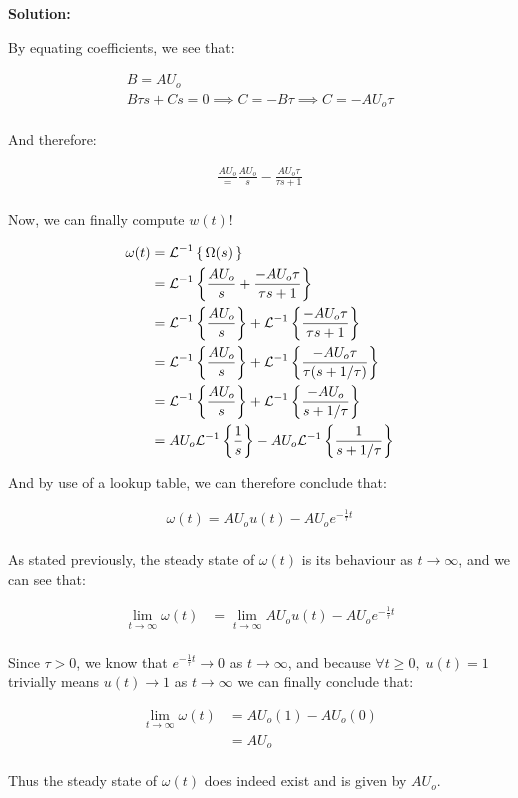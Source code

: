 \documentclass[10pt]{article}
\newenvironment{solution}{
	\vspace{1em}\par\large\textbf{{Solution:}}\par\vspace{1em}
}{
	\vspace{1em}
}
\begin{document}
\begin{solution}
	By equating coefficients, we see that:
	
	\begin{gather*}
		B = AU_{o} \\
		B\tau{s} + C{s} = 0 \implies C = -B\tau \implies C = -AU_{o}\tau \\
	\end{gather*}

	And therefore:

	\begin{gather*}
		\frac{AU_{o}} = \frac{AU_{o}}{s} - \frac{AU_{o}\tau}{\tau{s} + 1} \\
	\end{gather*}

	Now, we can finally compute $w(t)$!

	\begin{align*}
		\omega(t) &= \mathcal{L}^{-1}\set{\Omega(s)} \\
		&= \mathcal{L}^{-1} \left\{ \frac{AU_{o}}{s} + \frac{-AU_{o}\tau}{\tau{s} + 1} \right\} \\
		&= \mathcal{L}^{-1} \left\{ \frac{AU_{o}}{s} \right\} + \mathcal{L}^{-1} \left\{ \frac{-AU_{o}\tau}{\tau{s} + 1} \right\} \\
		&= \mathcal{L}^{-1} \left\{ \frac{AU_{o}}{s} \right\} + \mathcal{L}^{-1} \left\{ \frac{-AU_{o}\tau}{\tau(s + 1/\tau)} \right\} \\
		&= \mathcal{L}^{-1} \left\{ \frac{AU_{o}}{s} \right\} + \mathcal{L}^{-1} \left\{ \frac{-AU_{o}}{s + 1/\tau} \right\} \\
		&= AU_{o}\mathcal{L}^{-1} \left\{ \frac{1}{s} \right\} - AU_{o}\mathcal{L}^{-1} \left\{ \frac{1}{s + 1/\tau} \right\} \\
	\end{align*}

	And by use of a lookup table, we can therefore conclude that:

	\begin{gather*}
		\omega(t) = AU_{o}u(t) - AU_{o}e^{-\frac{1}{\tau}t} \\
	\end{gather*}

	As stated previously, the steady state of $\omega(t)$ is its behaviour as $t \rightarrow \infty$, and we can see that:

	\begin{align*}
		\lim_{t \rightarrow \infty} \omega(t) &= \lim_{t \rightarrow \infty}AU_{o}u(t) - AU_{o}e^{-\frac{1}{\tau}t} \\
	\end{align*}

	Since $\tau > 0$, we know that $e^{-\frac{1}{\tau}t} \rightarrow 0$ as
	$t \rightarrow \infty$, and because $\forall t \ge 0, \; u(t) = 1$ trivially
	means $u(t) \rightarrow 1$ as $t \rightarrow \infty$ we can finally conclude that:

	\begin{align*}
		\lim_{t\rightarrow\infty} \omega(t) &= AU_{o}(1) - AU_{o}(0) \\
		&= AU_{o} \\
	\end{align*}

	Thus the steady state of $\omega(t)$ does indeed exist and is given by $AU_{o}$.
\end{solution}
\end{document}
